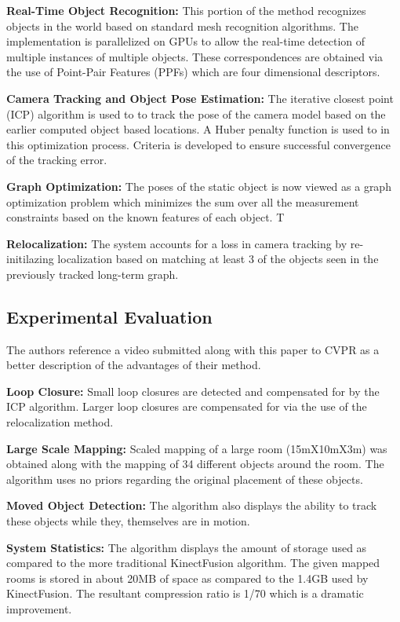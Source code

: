 \documentclass[10pt,twocolumn,letterpaper]{article}
\begin{document}
\textbf{Real-Time Object Recognition:} This portion of the method recognizes objects in the world based on standard mesh recognition algorithms. The implementation is parallelized on GPUs to allow the real-time detection of multiple instances of multiple objects. These correspondences are obtained via the use of Point-Pair Features (PPFs) which are four dimensional descriptors. 

\textbf{Camera Tracking and Object Pose Estimation:} The iterative closest point (ICP) algorithm is used to to track the pose of the camera model based on the earlier computed object based locations. A Huber penalty function is used to in this optimization process. Criteria is developed to ensure successful convergence of the tracking error.

\textbf{Graph Optimization:} The poses of the static object is now viewed as a graph optimization problem which minimizes the sum over all the measurement constraints based on the known features of each object. T

\textbf{Relocalization:} The system accounts for a loss in camera tracking by re-initilazing localization based on matching at least 3 of the objects seen in the previously tracked long-term graph. 

\subsection{Experimental Evaluation}
The authors reference a video submitted along with this paper to CVPR as a better description of the advantages of their method. 

\textbf{Loop Closure:} Small loop closures are detected and compensated for by the ICP algorithm. Larger loop closures are compensated for via the use of the relocalization method. 

\textbf{Large Scale Mapping:} Scaled mapping of a large room (15mX10mX3m) was obtained along with the mapping of 34 different objects around the room. The algorithm uses no priors regarding the original placement of these objects.

\textbf{Moved Object Detection:} The algorithm also displays the ability to track these objects while they, themselves are in motion. 

\textbf{System Statistics:} The algorithm displays the amount of storage used as compared to the more traditional KinectFusion algorithm. The given mapped rooms is stored in about 20MB of space as compared to the 1.4GB used by KinectFusion. The resultant compression ratio is 1/70 which is a dramatic improvement. 
\end{document}
